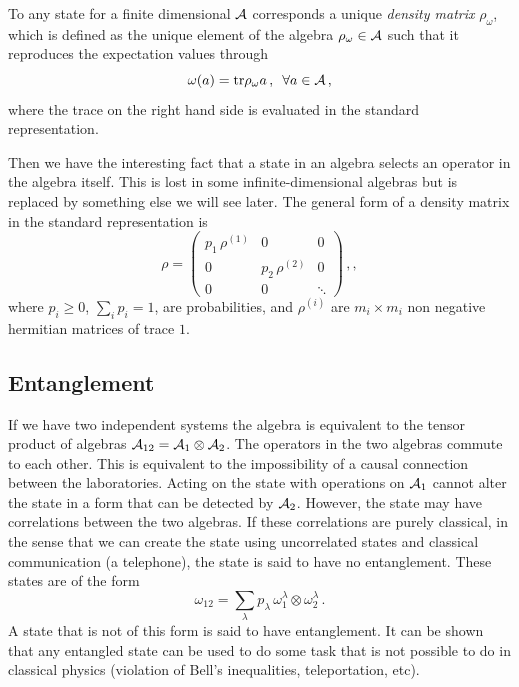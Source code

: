 \documentclass[11pt]{article}
\numberwithin{equation}{section}
\newcommand{\be}{\begin{equation}}
\newcommand{\ee}{\end{equation}}
\begin{document}
To any state for a finite dimensional ${\cal A}$ corresponds a unique {\sl density matrix} $\rho_\omega$, which is defined as the unique element of the algebra $ \rho_\omega\in  {\cal A}$ such that it reproduces the expectation values through  
\begin{equation}
\omega (a)=\textrm{tr} \rho_\omega a\,, \,\,\,\forall a\in {\cal A}\,,
 \end{equation} 
where the trace on the right hand side is evaluated in the standard representation. 

Then we have the interesting fact that a state in an algebra selects an operator in the algebra itself. This is lost in some infinite-dimensional algebras but is replaced by something else we will see later.  
The general form of a density matrix in the standard representation is 
\begin{equation}
\rho= \left(\begin{array}{ccc}
  p_1\, \rho^{(1)} & 0 & 0 \\
  0 & p_2 \, \rho^{(2)} & 0\\
  0 & 0 & \ddots
\end{array}\right)\,,,\label{matrtr}
\end{equation}
where $p_i\ge 0$, $\sum_i p_i=1$, are probabilities, and $\rho^{(i)}$ are $m_i\times m_i$ non negative hermitian matrices of trace $1$. 

\subsection{Entanglement}

If we have two independent systems the algebra is equivalent to the tensor product of algebras ${\cal A}_{12}={\cal A}_1\otimes {\cal A}_2$. The operators in the two algebras commute to each other. This is equivalent to the impossibility of a causal connection between the laboratories. Acting on the state with operations on ${\cal A}_1$ cannot alter the state in a form that can be detected by ${\cal A}_2$. However, the state may have correlations between the two algebras. If these correlations are purely classical, in the sense that we can create the state using uncorrelated states and classical communication (a telephone), the state is said to have no entanglement. These states are of the form
\be
\omega_{12} = \sum_\lambda p_\lambda\, \omega_1^\lambda \otimes \omega_2^\lambda\,.
\ee
A state that is not of this form is said to have entanglement. It can be shown that any entangled state can be used to do some task that is not possible to do in classical physics (violation of Bell's inequalities, teleportation, etc). 
\end{document}
